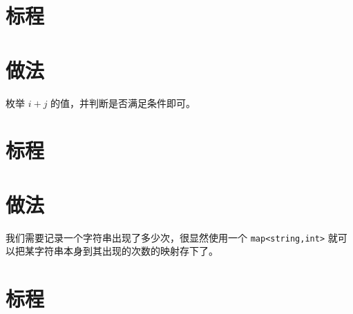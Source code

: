 \documentclass{ctsol}
\begin{document}
\section*{标程}

\makesolution
\section*{做法}

枚举 $i+j$ 的值，并判断是否满足条件即可。

\section*{标程}

\makesolution
\section*{做法}

我们需要记录一个字符串出现了多少次，很显然使用一个 \verb|map<string,int>| 就可以把某字符串本身到其出现的次数的映射存下了。

\section*{标程}
\end{document}
